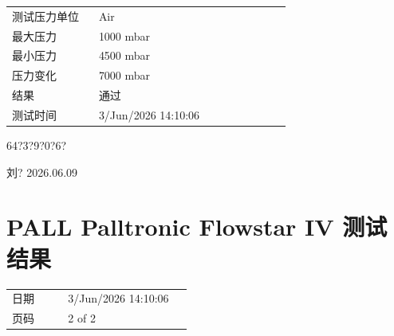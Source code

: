 \documentclass[UTF8,10pt,a4paper,fontset=fandol]{ctexart}
\newcommand{\fieldvalue}[1]{#1}
\newcommand{\handwritten}[1]{#1}
\begin{document}
\begin{tabular}{@{}p{0.28\linewidth}p{0.62\linewidth}@{}}
测试压力单位 &
\fieldvalue{Air}
\\[2pt]
最大压力 &
\fieldvalue{1000 mbar}
\\[2pt]
最小压力 &
\fieldvalue{4500 mbar}
\\[2pt]
压力变化 &
\fieldvalue{7000 mbar}
\\[2pt]
结果 &
\fieldvalue{通过}
\\[2pt]
测试时间 &
\fieldvalue{3/Jun/2026 14:10:06}
\end{tabular}

\vspace{1em}

\fieldvalue{\handwritten{64?3?9?0?6?}}

\vspace{1em}

\fieldvalue{\handwritten{刘? 2026.06.09}}

\section*{PALL Palltronic Flowstar IV 测试结果}

\begin{tabular}{@{}p{0.28\linewidth}p{0.62\linewidth}@{}}
日期 &
\fieldvalue{3/Jun/2026 14:10:06}
\\[2pt]
页码 &
\fieldvalue{2 of 2}
\end{tabular}

\vspace{1em}
\end{document}
